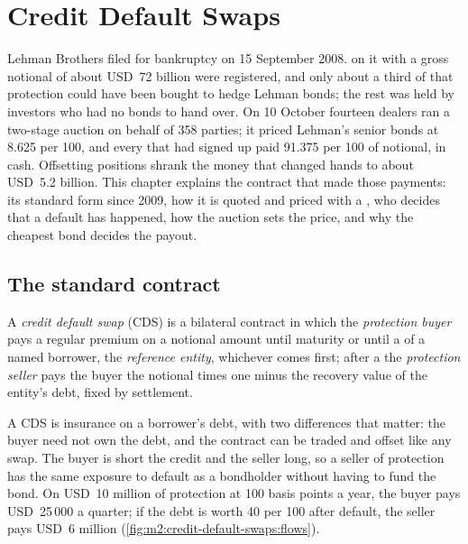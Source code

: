 \chapter{Credit Default Swaps}\label{ch:m2:credit-default-swaps}

Lehman Brothers filed for bankruptcy on 15 September 2008. 
on it with a gross notional of about USD~72 billion were registered, and only about a
third of that protection could have been bought to hedge Lehman bonds; the rest was
held by investors who had no bonds to hand over. On 10 October fourteen dealers
ran a two-stage auction on behalf of 358 parties; it priced Lehman's senior bonds at
8.625 per 100, and every  that had signed up paid 91.375 per 100 of
notional, in cash. Offsetting positions shrank the money that changed hands to about
USD~5.2 billion. This chapter explains the contract that made those payments: its
standard form since 2009, how it is quoted and priced with a , who decides
that a default has happened, how the auction sets the price, and why the cheapest bond
decides the payout.

\section{The standard contract}

\begin{definition}\label{def:m2:credit-default-swaps:cds}
A \emph{credit default swap} (CDS) is a bilateral contract in
which the \emph{protection buyer} pays a regular premium on a
notional amount until maturity or until a  of a named borrower, the
\emph{reference entity}, whichever comes first; after a  the \emph{protection seller} pays the buyer the notional
times one minus the recovery value of the entity's debt, fixed by settlement.
\end{definition}

A CDS is insurance on a borrower's debt, with two differences that matter: the buyer
need not own the debt, and the contract can be traded and offset like any swap. The
buyer is short the credit and the seller long, so a seller of protection has the same
exposure to default as a bondholder without having to fund the bond. On USD~10 million
of protection at 100 basis points a year, the buyer pays USD~25\,000 a quarter; if the
debt is worth 40 per 100 after default, the seller pays USD~6 million
(\cref{fig:m2:credit-default-swaps:flows}).

